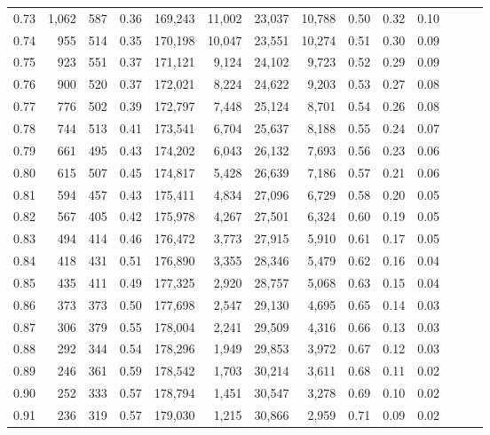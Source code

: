 \begin{tabular}{rrrrrrrrrrrrrr}
0.73 &  1,062 &  587 &  0.36 &  169,243 &   11,002 &  23,037 &  10,788 &  0.50 &  0.32 &      0.10 \\
0.74 &    955 &  514 &  0.35 &  170,198 &   10,047 &  23,551 &  10,274 &  0.51 &  0.30 &      0.09 \\
0.75 &    923 &  551 &  0.37 &  171,121 &    9,124 &  24,102 &   9,723 &  0.52 &  0.29 &      0.09 \\
0.76 &    900 &  520 &  0.37 &  172,021 &    8,224 &  24,622 &   9,203 &  0.53 &  0.27 &      0.08 \\
0.77 &    776 &  502 &  0.39 &  172,797 &    7,448 &  25,124 &   8,701 &  0.54 &  0.26 &      0.08 \\
0.78 &    744 &  513 &  0.41 &  173,541 &    6,704 &  25,637 &   8,188 &  0.55 &  0.24 &      0.07 \\
0.79 &    661 &  495 &  0.43 &  174,202 &    6,043 &  26,132 &   7,693 &  0.56 &  0.23 &      0.06 \\
0.80 &    615 &  507 &  0.45 &  174,817 &    5,428 &  26,639 &   7,186 &  0.57 &  0.21 &      0.06 \\
0.81 &    594 &  457 &  0.43 &  175,411 &    4,834 &  27,096 &   6,729 &  0.58 &  0.20 &      0.05 \\
0.82 &    567 &  405 &  0.42 &  175,978 &    4,267 &  27,501 &   6,324 &  0.60 &  0.19 &      0.05 \\
0.83 &    494 &  414 &  0.46 &  176,472 &    3,773 &  27,915 &   5,910 &  0.61 &  0.17 &      0.05 \\
0.84 &    418 &  431 &  0.51 &  176,890 &    3,355 &  28,346 &   5,479 &  0.62 &  0.16 &      0.04 \\
0.85 &    435 &  411 &  0.49 &  177,325 &    2,920 &  28,757 &   5,068 &  0.63 &  0.15 &      0.04 \\
0.86 &    373 &  373 &  0.50 &  177,698 &    2,547 &  29,130 &   4,695 &  0.65 &  0.14 &      0.03 \\
0.87 &    306 &  379 &  0.55 &  178,004 &    2,241 &  29,509 &   4,316 &  0.66 &  0.13 &      0.03 \\
0.88 &    292 &  344 &  0.54 &  178,296 &    1,949 &  29,853 &   3,972 &  0.67 &  0.12 &      0.03 \\
0.89 &    246 &  361 &  0.59 &  178,542 &    1,703 &  30,214 &   3,611 &  0.68 &  0.11 &      0.02 \\
0.90 &    252 &  333 &  0.57 &  178,794 &    1,451 &  30,547 &   3,278 &  0.69 &  0.10 &      0.02 \\
0.91 &    236 &  319 &  0.57 &  179,030 &    1,215 &  30,866 &   2,959 &  0.71 &  0.09 &      0.02 \\

\end{tabular}
